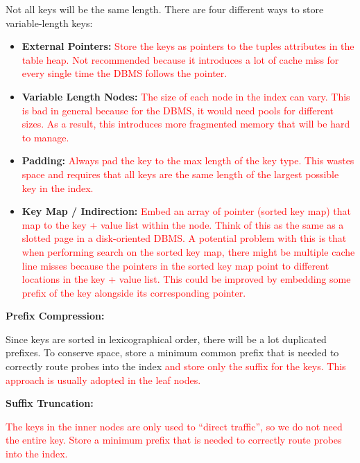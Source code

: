 \documentclass[11pt]{article}
\newcommand{\rr}[1]{\textcolor{red}{#1}}
\begin{document}
Not all keys will be the same length. There are four different ways to store variable-length keys:
\begin{itemize}
    \item \textbf{External Pointers:}
    \rr{Store the keys as pointers to the tuples attributes in the table heap. Not recommended because it introduces a lot of cache miss for every single time the DBMS follows the pointer.}
    \item \textbf{Variable Length Nodes:}
    \rr{The size of each node in the index can vary. This is bad in general because for the DBMS, it would need pools for different sizes. As a result, this introduces more fragmented memory that will be hard to manage.}
    \item \textbf{Padding:}
    \rr{Always pad the key to the max length of the key type. This wastes space and requires that all keys are the same length of the largest possible key in the index.}
    \item \textbf{Key Map / Indirection:}
    \rr{Embed an array of pointer (sorted key map) that map to the key + value list within the node. Think of this as the same as a slotted page in a disk-oriented DBMS. A potential problem with this is that when performing search on the sorted key map, there might be multiple cache line misses because the pointers in the sorted key map point to different locations in the key + value list. This could be improved by embedding some prefix of the key alongside its corresponding pointer.}
\end{itemize}


\textbf{Prefix Compression:}

Since keys are sorted in lexicographical order, there will be a lot duplicated 
prefixes. To conserve space, store a minimum common prefix that is needed to correctly route probes into the index \rr{and store only the suffix for the keys. This approach is usually adopted in the leaf nodes.}

\textbf{Suffix Truncation:}

\rr{The keys in the inner nodes are only used to ``direct traffic'', so we do not need the entire key. Store a minimum prefix that is needed to correctly route probes into the index.}

\end{document}
